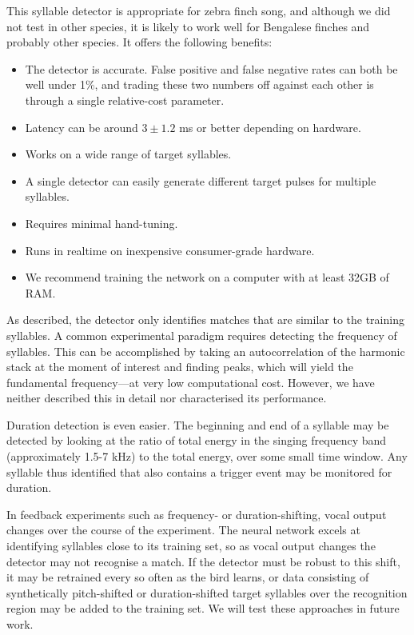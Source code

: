 \documentclass[10pt,letterpaper]{article}
\begin{document}
This syllable detector is appropriate for zebra finch song, and although we did not test in other species, it is likely to work well for Bengalese finches and probably other species.  It offers the following benefits:
\begin{itemize}
\item The detector is accurate. False positive and false negative rates can both be well under 1\%, and trading these two numbers off against each other is through a single relative-cost parameter.
\item Latency can be around $3\pm1.2$ ms or better depending on hardware.
\item Works on a wide range of target syllables.
\item A single detector can easily generate different target pulses for multiple syllables.
\item Requires minimal hand-tuning.
\item Runs in realtime on inexpensive consumer-grade hardware.
\item We recommend training the network on a computer with at least 32GB of RAM.
\end{itemize}

As described, the detector only identifies matches that are similar to the training syllables.  A common experimental paradigm requires detecting the frequency of syllables.  This can be accomplished by taking an autocorrelation of the harmonic stack at the moment of interest and finding peaks, which will yield the fundamental frequency---at very low computational cost.  However, we have neither described this in detail nor characterised its performance.

Duration detection is even easier.  The beginning and end of a syllable may be detected by looking at the ratio of total energy in the singing frequency band (approximately 1.5-7 kHz) to the total energy, over some small time window.  Any syllable thus identified that also contains a trigger event may be monitored for duration.

In feedback experiments such as frequency- or duration-shifting, vocal output changes over the course of the experiment.  The neural network excels at identifying syllables close to its training set, so as vocal output changes the detector may not recognise a match.  If the detector must be robust to this shift, it may be retrained every so often as the bird learns, or data consisting of synthetically pitch-shifted or duration-shifted target syllables over the recognition region may be added to the training set.  We will test these approaches in future work.
\end{document}
